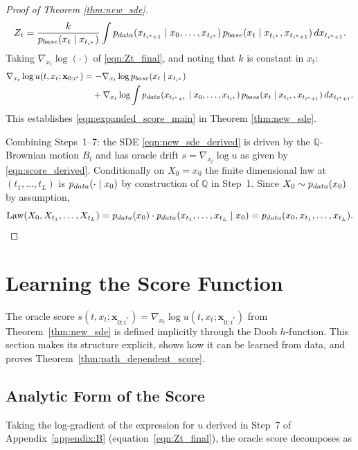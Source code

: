 \documentclass{article}
\newcommand{\pdata}{p_{\normalfont{data}}}
\newcommand{\pbase}{p_{\normalfont{base}}}
\newcommand{\QQ}{\mathbb{Q}}
\begin{document}
\begin{proof}[Proof of Theorem \ref{thm:new_sde}]
\begin{equation}\label{eqn:Zt_final}
  Z_t
  = \frac{k}{\pbase(x_t\mid x_{t_{i^*}})}
    \int \pdata(x_{t_{i^*+1}}\mid x_0,\ldots,x_{t_{i^*}})\,
         \pbase(x_t\mid x_{t_{i^*}},x_{t_{i^*+1}})\,dx_{t_{i^*+1}}.
\end{equation}
Taking $\nabla_{x_t}\log(\cdot)$ of \eqref{eqn:Zt_final}, and noting that $k$
is constant in $x_t$:
\begin{align}
  \nabla_{x_t}\log u(t,x_t;\mathbf{x}_{0:i^*})
  &= -\nabla_{x_t}\log\pbase(x_t\mid x_{t_{i^*}}) \nonumber\\
  &\quad+ \nabla_{x_t}\log\int
      \pdata(x_{t_{i^*+1}}\mid x_0,\ldots,x_{t_{i^*}})\,
      \pbase(x_t\mid x_{t_{i^*}},x_{t_{i^*+1}})\,
      dx_{t_{i^*+1}}.\label{eqn:score_derived}
\end{align}
This establishes \eqref{eqn:expanded_score_main} in Theorem \ref{thm:new_sde}.

\medskip
Combining Steps~1--7: the SDE \eqref{eqn:new_sde_derived} is driven by the
$\QQ$-Brownian motion $B_t$ and has oracle drift $s=\nabla_{x_t}\log u$ as given
by \eqref{eqn:score_derived}.  Conditionally on $X_0=x_0$ the finite dimensional law
at $(t_1,\ldots,t_L)$ is $\pdata(\cdot\mid x_0)$ by construction of $\QQ$ in
Step~1.  Since $X_0\sim\pdata(x_0)$ by assumption,
\[
  \mathrm{Law}(X_0,X_{t_1},\ldots,X_{t_L})
  = \pdata(x_0)\cdot\pdata(x_{t_1},\ldots,x_{t_L}\mid x_0)
  = \pdata(x_0,x_{t_1},\ldots,x_{t_L}).
\]
\end{proof}


\section{Learning the Score Function}
\label{appendix:C}

The oracle score $s(t,x_t;\mathbf{x}_{0:i^*}) = \nabla_{x_t}\log u(t,x_t;\mathbf{x}_{0:i^*})$ from Theorem~\ref{thm:new_sde} is defined implicitly through the Doob $h$-function.  This section makes its structure explicit, shows how it can be learned from data, and proves Theorem~\ref{thm:path_dependent_score}.

\subsection{Analytic Form of the Score}
\label{subsec:analytic_score_function}

Taking the log-gradient of the expression for $u$ derived in Step~7 of Appendix~\ref{appendix:B} (equation~\eqref{eqn:Zt_final}), the oracle score decomposes as
\end{document}
